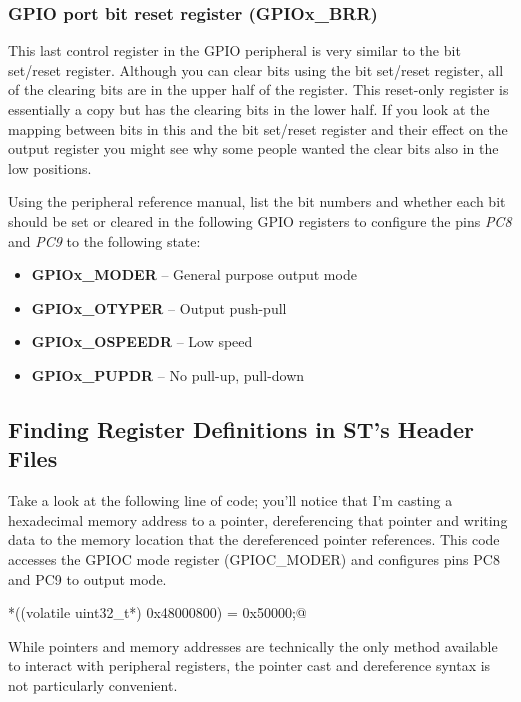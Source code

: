 \documentclass[11pt,fleqn]{book} %
\makeatletter
\newcommand{\ilcode}[1]{
    \smallskip
    \colorbox{gray!20!white}{
        \centering
        \parbox{\linewidth-2\fboxsep}{
            \lstinline@#1@
        }
    }
}
\makeatother
\begin{document}
\subsubsection{GPIO port bit reset register (GPIOx\_BRR)}
This last control register in the GPIO peripheral is very similar to the bit set/reset register. Although you can clear bits using the bit set/reset register, all of the clearing bits are in the upper half of the register. This reset-only register is essentially a copy but has the clearing bits in the lower half. If you look at the mapping between bits in this and the bit set/reset register and their effect on the output register you might see why some people wanted the clear bits also in the low positions.

\newpage
\begin{exercise}
    \label{ex1}
    Using the peripheral reference manual, list the bit numbers and whether each bit should be set or cleared in the following GPIO registers to configure the pins \textit{PC8} and \textit{PC9} to the following state:
    \begin{itemize}
        \item \textbf{GPIOx\_MODER} -- General purpose output mode
        \item \textbf{GPIOx\_OTYPER} -- Output push-pull
        \item \textbf{GPIOx\_OSPEEDR} -- Low speed 
        \item \textbf{GPIOx\_PUPDR} -- No pull-up, pull-down 
    \end{itemize}
\end{exercise}

\subsection{Finding Register Definitions in ST's Header Files}

Take a look at the following line of code; you'll notice that I'm casting a hexadecimal memory address to a pointer, dereferencing that pointer and writing data to the memory location that the dereferenced pointer references. This code accesses the GPIOC mode register (GPIOC\_MODER) and configures pins PC8 and PC9 to output mode.

\ilcode{*((volatile uint32\_t*) 0x48000800) = 0x50000;}%
\smallskip

While pointers and memory addresses are technically the only method available to interact with peripheral registers, the pointer cast and dereference syntax is not particularly convenient.
\end{document}
